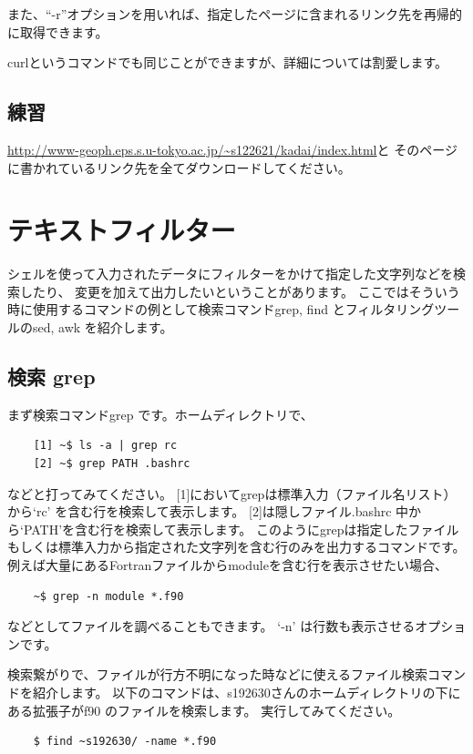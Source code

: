\documentclass[a4j]{ltjsreport}
\begin{document}
    また、“-r”オプションを用いれば、指定したページに含まれるリンク先を再帰的に取得できます。

    curlというコマンドでも同じことができますが、詳細については割愛します。

    \vspace{1em}

    \subsection{練習}
    \url{http://www-geoph.eps.s.u-tokyo.ac.jp/~s122621/kadai/index.html}と
    そのページに書かれているリンク先を全てダウンロードしてください。

    \section{テキストフィルター}
    シェルを使って入力されたデータにフィルターをかけて指定した文字列などを検索したり、
    変更を加えて出力したいということがあります。
    ここではそういう時に使用するコマンドの例として検索コマンドgrep, find
    とフィルタリングツールのsed, awk を紹介します。

    \subsection{検索 grep} 
    まず検索コマンドgrep です。ホームディレクトリで、
    \begin{verbatim}
    [1] ~$ ls -a | grep rc
    [2] ~$ grep PATH .bashrc
    \end{verbatim}
    などと打ってみてください。
    [1]においてgrepは標準入力（ファイル名リスト）から`rc' を含む行を検索して表示します。
    [2]は隠しファイル.bashrc 中から`PATH'を含む行を検索して表示します。
    このようにgrepは指定したファイルもしくは標準入力から指定された文字列を含む行のみを出力するコマンドです。
    例えば大量にあるFortranファイルからmoduleを含む行を表示させたい場合、
    \begin{verbatim}
    ~$ grep -n module *.f90
    \end{verbatim}
    などとしてファイルを調べることもできます。
    `-n' は行数も表示させるオプションです。

    検索繋がりで、ファイルが行方不明になった時などに使えるファイル検索コマンドを紹介します。
    以下のコマンドは、s192630さんのホームディレクトリの下にある拡張子がf90 のファイルを検索します。
    実行してみてください。
    \begin{verbatim}
    $ find ~s192630/ -name *.f90
    \end{verbatim}
\end{document}
